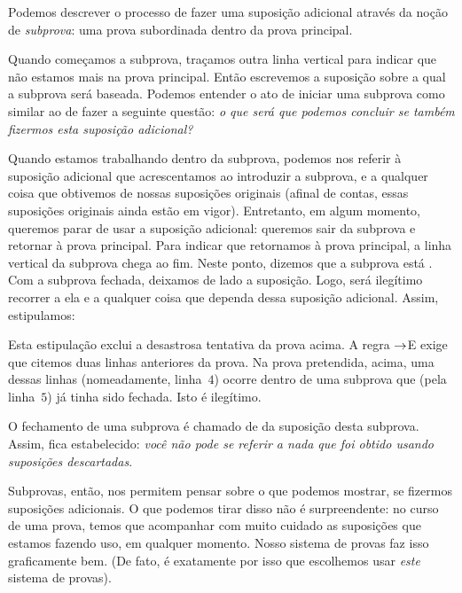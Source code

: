 Podemos descrever o processo de fazer uma suposição adicional através da noção de \emph{subprova}: uma prova subordinada dentro da prova principal. 

Quando começamos a subprova, traçamos outra linha vertical para indicar que não estamos mais na prova principal. Então escrevemos a suposição sobre a qual a subprova será baseada.  Podemos entender o ato de iniciar uma subprova como similar ao de fazer a seguinte questão:  \emph{o que será que podemos concluir se também fizermos esta suposição adicional?}

Quando estamos trabalhando dentro da subprova, podemos nos referir à suposição adicional que acrescentamos ao introduzir a subprova,  e a qualquer coisa que obtivemos de nossas suposições originais (afinal de contas, essas suposições originais ainda estão em vigor). Entretanto, em algum momento,  queremos parar de usar a suposição adicional: queremos sair da subprova e retornar à prova principal. Para indicar que retornamos à prova principal, a linha vertical da subprova chega ao fim.  Neste ponto, dizemos que a subprova está . Com a subprova fechada, deixamos de lado a suposição.  Logo, será ilegítimo recorrer a ela e a qualquer coisa que dependa dessa suposição adicional. Assim, estipulamos:


Esta estipulação exclui a desastrosa tentativa da prova acima. A regra $\rightarrow$E exige que citemos duas linhas anteriores da prova. Na prova pretendida, acima, uma dessas linhas (nomeadamente, linha~$4$)  ocorre dentro de uma subprova que (pela linha~$5$) já tinha sido fechada. Isto é ilegítimo. 

O fechamento de uma subprova é chamado de  da suposição desta subprova. Assim, fica estabelecido: \emph{você não pode se referir a nada que foi obtido usando suposições descartadas}. 

Subprovas, então, nos permitem pensar sobre o que podemos mostrar,  se fizermos suposições adicionais.  O que podemos  tirar disso não é surpreendente: no curso de uma prova, temos que acompanhar com muito cuidado as suposições que estamos fazendo uso, em qualquer momento.  Nosso sistema de provas faz isso graficamente bem. (De fato, é exatamente por isso que escolhemos usar  \emph{este}  sistema de provas).

